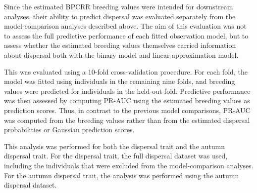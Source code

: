 Since the estimated BPCRR breeding values were intended for downstream analyses, their ability to predict dispersal was evaluated separately from the model-comparison analyses described above. The aim of this evaluation was not to assess the full predictive performance of each fitted observation model, but to assess whether the estimated breeding values themselves carried information about dispersal both with the binary model and linear approximation model.

This was evaluated using a 10-fold cross-validation procedure. For each fold, the model was fitted using individuals in the remaining nine folds, and breeding values were predicted for individuals in the held-out fold. Predictive performance was then assessed by computing PR-AUC using the estimated breeding values as prediction scores. Thus, in contrast to the previous model comparisons, PR-AUC was computed from the breeding values rather than from the estimated dispersal probabilities or Gaussian prediction scores.

This analysis was performed for both the dispersal trait and the autumn dispersal trait. For the dispersal trait, the full dispersal dataset was used, including the individuals that were excluded from the model-comparison analyses. For the autumn dispersal trait, the analysis was performed using the autumn dispersal dataset.








